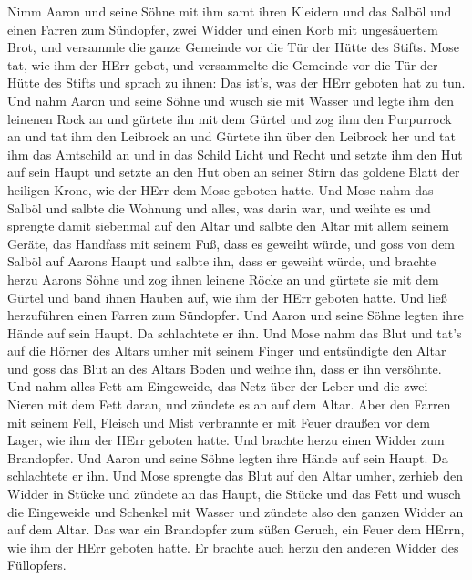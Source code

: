 Nimm Aaron und seine Söhne mit ihm samt ihren Kleidern und das Salböl
und einen Farren zum Sündopfer, zwei Widder und einen Korb mit
ungesäuertem Brot,  und versammle die ganze Gemeinde vor die
Tür der Hütte des Stifts.  Mose tat, wie ihm der HErr gebot,
und versammelte die Gemeinde vor die Tür der Hütte des Stifts
 und sprach zu ihnen: Das ist's, was der HErr geboten hat zu
tun.  Und nahm Aaron und seine Söhne und wusch sie mit
Wasser  und legte ihm den leinenen Rock an und gürtete ihn
mit dem Gürtel und zog ihm den Purpurrock an und tat ihm den Leibrock an
und Gürtete ihn über den Leibrock her  und tat ihm das
Amtschild an und in das Schild Licht und Recht  und setzte
ihm den Hut auf sein Haupt und setzte an den Hut oben an seiner Stirn
das goldene Blatt der heiligen Krone, wie der HErr dem Mose geboten
hatte.  Und Mose nahm das Salböl und salbte die Wohnung und
alles, was darin war, und weihte es  und sprengte damit
siebenmal auf den Altar und salbte den Altar mit allem seinem Geräte,
das Handfass mit seinem Fuß, dass es geweiht würde,  und
goss von dem Salböl auf Aarons Haupt und salbte ihn, dass er geweiht
würde,  und brachte herzu Aarons Söhne und zog ihnen
leinene Röcke an und gürtete sie mit dem Gürtel und band ihnen Hauben
auf, wie ihm der HErr geboten hatte.  Und ließ herzuführen
einen Farren zum Sündopfer. Und Aaron und seine Söhne legten ihre Hände
auf sein Haupt.  Da schlachtete er ihn. Und Mose nahm das
Blut und tat's auf die Hörner des Altars umher mit seinem Finger und
entsündigte den Altar und goss das Blut an des Altars Boden und weihte
ihn, dass er ihn versöhnte.  Und nahm alles Fett am
Eingeweide, das Netz über der Leber und die zwei Nieren mit dem Fett
daran, und zündete es an auf dem Altar.  Aber den Farren
mit seinem Fell, Fleisch und Mist verbrannte er mit Feuer draußen vor
dem Lager, wie ihm der HErr geboten hatte.  Und brachte
herzu einen Widder zum Brandopfer. Und Aaron und seine Söhne legten ihre
Hände auf sein Haupt.  Da schlachtete er ihn. Und Mose
sprengte das Blut auf den Altar umher,  zerhieb den Widder
in Stücke und zündete an das Haupt, die Stücke und das Fett
 und wusch die Eingeweide und Schenkel mit Wasser und
zündete also den ganzen Widder an auf dem Altar. Das war ein Brandopfer
zum süßen Geruch, ein Feuer dem HErrn, wie ihm der HErr geboten hatte.
 Er brachte auch herzu den anderen Widder des Füllopfers.
